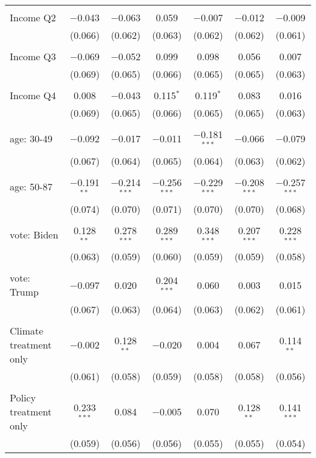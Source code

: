 \begin{tabular}{@{\extracolsep{5pt}}lcccccc}
  & & & & & & \\ 
 Income Q2 & $-$0.043 & $-$0.063 & 0.059 & $-$0.007 & $-$0.012 & $-$0.009 \\ 
  & (0.066) & (0.062) & (0.063) & (0.062) & (0.062) & (0.061) \\ 
  & & & & & & \\ 
 Income Q3 & $-$0.069 & $-$0.052 & 0.099 & 0.098 & 0.056 & 0.007 \\ 
  & (0.069) & (0.065) & (0.066) & (0.065) & (0.065) & (0.063) \\ 
  & & & & & & \\ 
 Income Q4 & 0.008 & $-$0.043 & 0.115$^{*}$ & 0.119$^{*}$ & 0.083 & 0.016 \\ 
  & (0.069) & (0.065) & (0.066) & (0.065) & (0.065) & (0.063) \\ 
  & & & & & & \\ 
 age: 30-49 & $-$0.092 & $-$0.017 & $-$0.011 & $-$0.181$^{***}$ & $-$0.066 & $-$0.079 \\ 
  & (0.067) & (0.064) & (0.065) & (0.064) & (0.063) & (0.062) \\ 
  & & & & & & \\ 
 age: 50-87 & $-$0.191$^{**}$ & $-$0.214$^{***}$ & $-$0.256$^{***}$ & $-$0.229$^{***}$ & $-$0.208$^{***}$ & $-$0.257$^{***}$ \\ 
  & (0.074) & (0.070) & (0.071) & (0.070) & (0.070) & (0.068) \\ 
  & & & & & & \\ 
 vote: Biden & 0.128$^{**}$ & 0.278$^{***}$ & 0.289$^{***}$ & 0.348$^{***}$ & 0.207$^{***}$ & 0.228$^{***}$ \\ 
  & (0.063) & (0.059) & (0.060) & (0.059) & (0.059) & (0.058) \\ 
  & & & & & & \\ 
 vote: Trump & $-$0.097 & 0.020 & 0.204$^{***}$ & 0.060 & 0.003 & 0.015 \\ 
  & (0.067) & (0.063) & (0.064) & (0.063) & (0.062) & (0.061) \\ 
  & & & & & & \\ 
 Climate treatment only & $-$0.002 & 0.128$^{**}$ & $-$0.020 & 0.004 & 0.067 & 0.114$^{**}$ \\ 
  & (0.061) & (0.058) & (0.059) & (0.058) & (0.058) & (0.056) \\ 
  & & & & & & \\ 
 Policy treatment only & 0.233$^{***}$ & 0.084 & $-$0.005 & 0.070 & 0.128$^{**}$ & 0.141$^{***}$ \\ 
  & (0.059) & (0.056) & (0.056) & (0.055) & (0.055) & (0.054) \\ 

\end{tabular}
